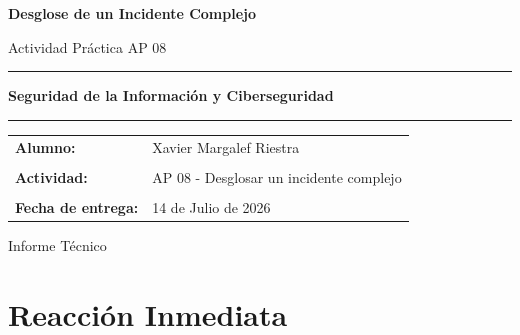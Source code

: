 \documentclass[11pt,a4paper]{article}
\begin{document}

\begin{titlepage}

\centering

\vspace*{2cm}

{\Huge\bfseries Desglose de un Incidente Complejo \par}

\vspace{0.5cm}

{\Large Actividad Práctica AP 08\par}

\vspace{2cm}

\rule{\textwidth}{1.2pt}

\vspace{1cm}

{\Large\bfseries Seguridad de la Información y Ciberseguridad}

\vspace{1cm}

\rule{\textwidth}{1.2pt}

\vfill

\begin{tabular}{ll}
\textbf{Alumno:} & Xavier Margalef Riestra \\
\\
\textbf{Actividad:} & AP 08 - Desglosar un incidente complejo \\
\\
\textbf{Fecha de entrega:} & 14 de Julio de 2026 \\
\end{tabular}

\vfill

{\large Informe Técnico}

\vspace{1cm}

\end{titlepage}

\tableofcontents
\newpage


\section{Reacción Inmediata}
\end{document}
